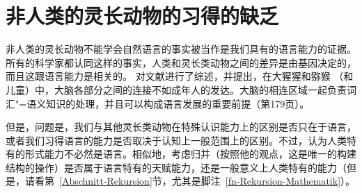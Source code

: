 \section{非人类的灵长动物的习得的缺乏}

非人类的灵长动物不能学会自然语言的事实被当作是我们具有的语言能力的证据。所有的科学家都认同这样的事实，人类和灵长类动物之间的差异是由基因决定的，而且这跟语言能力是相关的。
\citet{Friederici2009a}对文献进行了综述，并提出，在大猩猩和猕猴 （和儿童）中，大脑各部分之间的连接不如成年人的发达。大脑的相连区域一起负责词汇"=语义知识的处理，并且可以构成语言发展的重要前提（第179页）。

但是，问题是，我们与其他灵长类动物在特殊认识能力上的区别是否只在于语言，或者我们习得语言的能力是否取决于认知上一般范围上的区别。不过，\citet[Section~2]{Fanselow92b}认为人类特有的形式能力不必然是语言。相似地，\citet[--8]{Chomsky2007a}考虑归并（按照他的观点，这是唯一的构建结构的操作）是否属于语言特有的天赋能力，还是一般意义上人类特有的能力（但是，请看第~\ref{Abschnitt-Rekursion}节，尤其是脚注~\ref{fn-Rekursion-Mathematik}）。

